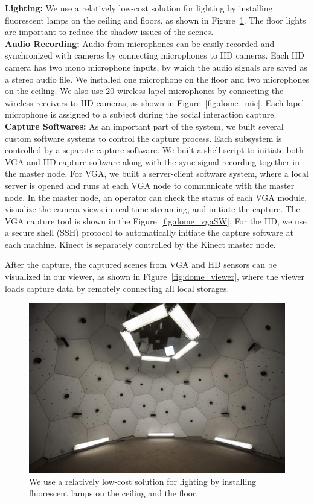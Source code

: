 \noindent \textbf{Lighting:} We use a relatively low-cost solution for lighting by installing fluorescent lamps on the ceiling and floors, as shown in Figure~\ref{fig:dome_lighting}. The floor lights are important to reduce the shadow issues of the scenes. 
\mbox{ }\\
\noindent \textbf{Audio Recording:} Audio from microphones can be easily recorded and synchronized with cameras by connecting microphones to HD cameras. Each HD camera has two mono microphone inputs, by which the audio signals are saved as a stereo audio file. We installed one microphone on the floor and two microphones on the ceiling. We also use 20 wireless lapel microphones by connecting the wireless receivers to HD cameras, as shown in Figure~\ref{fig:dome_mic}. Each lapel microphone is assigned to a subject during the social interaction capture.  
\mbox{ }\\
\noindent \textbf{Capture Softwares:} As an important part of the system, we built several custom software systems to control the capture process. Each subsystem is controlled by a separate capture software. We built a shell script to initiate both VGA and  HD capture software along with the sync signal recording together in the master node. For VGA, we built a server-client software system, where a local server is opened and runs at each VGA node to communicate with the master node. In the master node, an operator can check the status of each VGA module, visualize the camera views in real-time streaming, and initiate the capture. The VGA capture tool is shown in the Figure~\ref{fig:dome_vgaSW}. For the HD, we use a secure shell (SSH) protocol to automatically initiate the capture software at each machine. Kinect is separately controlled by the Kinect master node.

After the capture, the captured scenes from VGA and HD sensors can be visualized in our viewer, as shown in Figure~\ref{fig:dome_viewer}, where the viewer loads capture data by remotely connecting all local storages. 

\begin{figure}
	\includegraphics[width=\linewidth]{fig_system/dome_lighting}
	\caption{We use a relatively low-cost solution for lighting by installing fluorescent lamps on the ceiling and the floor.}
	\label{fig:dome_lighting}
\end{figure}

